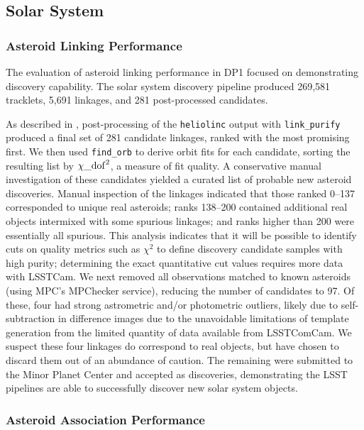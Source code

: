 \subsection{Solar System}
\label{sec:performance:solsys}

\subsubsection{Asteroid Linking Performance}

The evaluation of asteroid linking performance in DP1 focused on demonstrating discovery capability.
The solar system discovery pipeline produced 269,581 tracklets, 5,691 linkages, and 281 post-processed candidates.

As described in , post-processing of the \texttt{heliolinc} output with \texttt{link\_purify} produced a final set of 281 candidate linkages, ranked with the most promising first. 
We then used \texttt{find\_orb} \citep{findorb} to derive orbit fits for each candidate, sorting the resulting list by $\chi\_{\rm dof}^2$, a measure of fit quality. 
A conservative manual investigation of these candidates yielded a curated list of \nnewasteroiddiscoveries probable new asteroid discoveries.
Manual inspection of the linkages indicated that those ranked 0--137 corresponded to unique real asteroids; ranks 138--200 contained additional real objects intermixed with some spurious linkages; and ranks higher than 200 were essentially all spurious.
This analysis indicates that it will be possible to identify cuts on quality metrics such as $\chi^2$ to define discovery candidate samples with high purity; determining the exact quantitative cut values requires more data with \gls{LSSTCam}.
We next removed all observations matched to known asteroids (using \gls{MPC}'s MPChecker service), reducing the number of candidates to 97.
Of these, four had strong astrometric and/or photometric outliers, likely due to self-subtraction in difference images due to the unavoidable limitations of template generation from the limited quantity of data available from  \gls{LSSTComCam}.
We suspect these four linkages do correspond to real objects, but have chosen to discard them out of an abundance of caution.
The remaining \nnewasteroiddiscoveries were submitted to the Minor Planet Center and accepted as  discoveries, demonstrating the \gls{LSST} pipelines are able to successfully discover new solar system objects.

\subsubsection{Asteroid Association Performance}
\label{ssec:asteroid_association}

